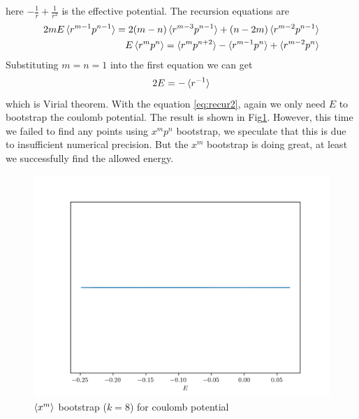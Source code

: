 \documentclass[aps, preprint,amsmath, amssymb]{revtex4-2}
\begin{document}
here $- \frac1r + \frac1{r^2}$ is the effective potential. The recursion equations are 
\begin{align}
    2mE\braket{r^{m - 1} p^{n - 1}} = 2(m - n)\braket{r^{m - 3} p^{n - 1}} + (n - 2m)\braket{r^{m - 2} p^{n - 1}} \notag \\ 
    E\braket{r^m p^n} = \braket{r^m p^{n + 2}} - \braket{r^{m - 1} p^n} + \braket{r^{m - 2} p^n}
\end{align}
Substituting $m = n = 1$ into the first equation we can get
\begin{equation}
    2E = -\braket{r^{-1}}
\end{equation}
which is Virial theorem. With the equation \eqref{eq:recur2}, again we only need $E$ to bootstrap the coulomb potential. The result is shown in Fig\ref{fig:coulomb}. However, this time we failed to find any points using $x^m p^n$ bootstrap, we speculate that this is due to insufficient numerical precision. But the $x^m$ bootstrap is doing great, at least we successfully find the allowed energy.
\begin{figure}
    \includegraphics[width=0.8\linewidth]{coulomb.png}
    \caption{$\braket{x^m}$ bootstrap ($k = 8$) for coulomb potential}
    \label{fig:coulomb}
\end{figure}
\end{document}
